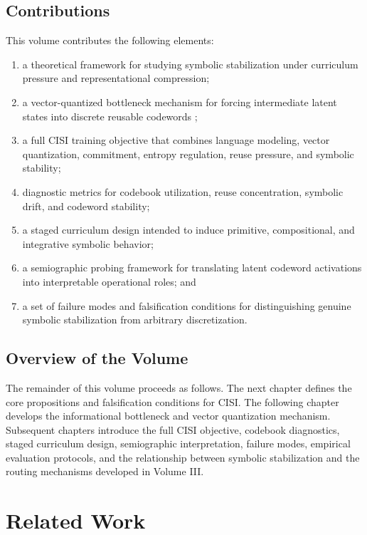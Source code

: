 \section{Contributions}
This volume contributes the following elements:
\begin{enumerate}
    \item a theoretical framework for studying symbolic stabilization under curriculum pressure and representational compression;
    \item a vector-quantized bottleneck mechanism for forcing intermediate latent states into discrete reusable codewords \cite{Vaswani2017};
    \item a full CISI training objective that combines language modeling, vector quantization, commitment, entropy regulation, reuse pressure, and symbolic stability;
    \item diagnostic metrics for codebook utilization, reuse concentration, symbolic drift, and codeword stability;
    \item a staged curriculum design intended to induce primitive, compositional, and integrative symbolic behavior;
    \item a semiographic probing framework for translating latent codeword activations into interpretable operational roles; and
    \item a set of failure modes and falsification conditions for distinguishing genuine symbolic stabilization from arbitrary discretization.
\end{enumerate}
\section{Overview of the Volume}
The remainder of this volume proceeds as follows. The next chapter defines the core propositions and falsification conditions for CISI. The following chapter develops the informational bottleneck and vector quantization mechanism. Subsequent chapters introduce the full CISI objective, codebook diagnostics, staged curriculum design, semiographic interpretation, failure modes, empirical evaluation protocols, and the relationship between symbolic stabilization and the routing mechanisms developed in Volume III.

\chapter{Related Work}
